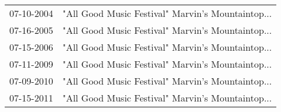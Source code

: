 \begin{supertabular}{ll}
 07-10-2004 &  "All Good Music Festival" Marvin's Mountaintop... \\
 07-16-2005 &  "All Good Music Festival" Marvin's Mountaintop... \\
 07-15-2006 &  "All Good Music Festival" Marvin's Mountaintop... \\
 07-11-2009 &  "All Good Music Festival" Marvin's Mountaintop... \\
 07-09-2010 &  "All Good Music Festival" Marvin's Mountaintop... \\
 07-15-2011 &  "All Good Music Festival" Marvin's Mountaintop... \\
\end{supertabular}
